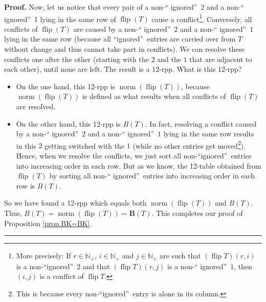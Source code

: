 \documentclass[numbers=enddot,12pt,final,onecolumn,notitlepage]{scrartcl}%
\theoremstyle{definition}
\newenvironment{proof}[1][Proof]{\noindent\textbf{#1.} }{\ \rule{0.5em}{0.5em}}
\begin{document}
\begin{proof}
Now, let us notice that every pair of a non-\textquotedblleft
ignored\textquotedblright\ $2$ and a non-\textquotedblleft
ignored\textquotedblright\ $1$ lying in the same row of $\operatorname*{flip}%
\left(  T\right)  $ cause a conflict\footnote{More precisely: If
$r\in\mathbb{N}_{+}$, $i\in\mathbb{N}_{+}$ and $j\in\mathbb{N}_{+}$ are such
that $\left(  \operatorname*{flip}T\right)  \left(  r,i\right)  $ is a
non-\textquotedblleft ignored\textquotedblright\ $2$ and that $\left(
\operatorname*{flip}T\right)  \left(  r,j\right)  $ is a non-\textquotedblleft
ignored\textquotedblright\ $1$, then $\left(  i,j\right)  $ is a conflict of
$\operatorname*{flip}T$.}. Conversely, all conflicts of $\operatorname*{flip}%
\left(  T\right)  $ are caused by a non-\textquotedblleft
ignored\textquotedblright\ $2$ and a non-\textquotedblleft
ignored\textquotedblright\ $1$ lying in the same row (because all
\textquotedblleft ignored\textquotedblright\ entries are carried over from $T$
without change and thus cannot take part in conflicts). We can resolve these
conflicts one after the other (starting with the $2$ and the $1$ that are
adjacent to each other), until none are left. The result is a 12-rpp. What is
this 12-rpp?

\begin{itemize}
\item On the one hand, this 12-rpp is $\operatorname*{norm}\left(
\operatorname*{flip}\left(  T\right)  \right)  $, because
$\operatorname*{norm}\left(  \operatorname*{flip}\left(  T\right)  \right)  $
is defined as what results when all conflicts of $\operatorname*{flip}\left(
T\right)  $ are resolved.

\item On the other hand, this 12-rpp is $B\left(  T\right)  $. In fact,
resolving a conflict caused by a non-\textquotedblleft
ignored\textquotedblright\ $2$ and a non-\textquotedblleft
ignored\textquotedblright\ $1$ lying in the same row results in this $2$
getting switched with the $1$ (while no other entries get moved\footnote{This
is because every non-\textquotedblleft ignored\textquotedblright\ entry is
alone in its column.}). Hence, when we resolve the conflicts, we just sort all
non-\textquotedblleft ignored\textquotedblright\ entries into increasing order
in each row. But as we know, the 12-table obtained from $\operatorname*{flip}%
\left(  T\right)  $ by sorting all non-\textquotedblleft
ignored\textquotedblright\ entries into increasing order in each row is
$B\left(  T\right)  $.
\end{itemize}

So we have found a 12-rpp which equals both $\operatorname*{norm}\left(
\operatorname*{flip}\left(  T\right)  \right)  $ and $B\left(  T\right)  $.
Thus, $B\left(  T\right)  =\operatorname*{norm}\left(  \operatorname*{flip}%
\left(  T\right)  \right)  =\mathbf{B}\left(  T\right)  $. This completes our
proof of Proposition \ref{prop.BK=BK}.
\end{proof}
\end{document}
